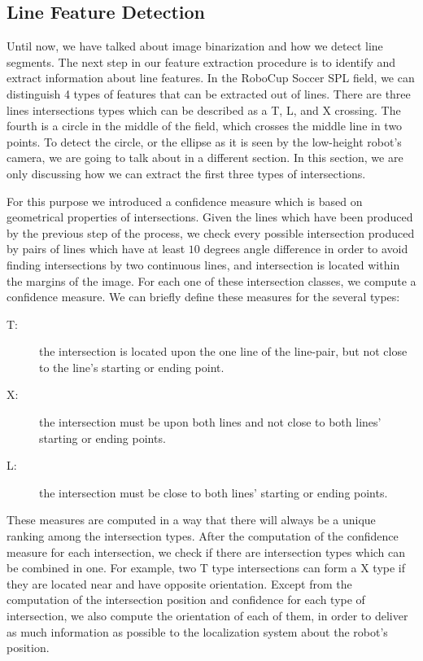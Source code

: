 \documentclass[	DIV=calc,%
							paper=a4,%
							fontsize=9pt,%
							twocolumn]{scrartcl}	 					%
\begin{document}
\subsection{Line Feature Detection}
Until now, we have talked about image binarization and how we detect line segments. The next step in our feature extraction procedure is to identify and extract information about line features. In the RoboCup Soccer SPL field, we can distinguish 4 types of features that can be extracted out of lines. There are three lines intersections types which can be described as a T, L, and X crossing.  The fourth is a circle in the middle of the field, which crosses the middle line in two points.  To detect the circle, or the ellipse as it is seen by the low-height robot's camera, we are going to talk about in a different section. In this section, we are only discussing how we can extract the first three types of intersections.

For this purpose we introduced a confidence measure which is based on geometrical properties of intersections. Given the lines which have been produced by the previous step of the process, we check every possible intersection produced by pairs of lines which have at least $10$ degrees angle difference in order to avoid finding intersections by two continuous lines, and intersection is located within the margins of the image. For each one of these intersection classes, we compute a confidence measure. We can briefly define these measures for the several types:
\begin{description}
\item[T:]{ the intersection is located upon the one line of the line-pair, but not close to the line's starting or ending point.}
\item[X:]{ the intersection must be upon both lines and not close to both lines' starting or ending points. }
\item[L:]{ the intersection must be close to both lines' starting or ending points.}
\end{description}
These measures are computed in a way that there will always be a unique ranking among the intersection types. After the computation of the confidence measure for each intersection, we check if there are intersection types which can be combined in one. For example, two T type intersections can form a X type if they are located near and have opposite orientation. Except from the computation of the intersection position and confidence for each type of intersection, we also compute the orientation of each of them, in order to deliver as much information as possible to the localization system about the robot's position.
\end{document}
